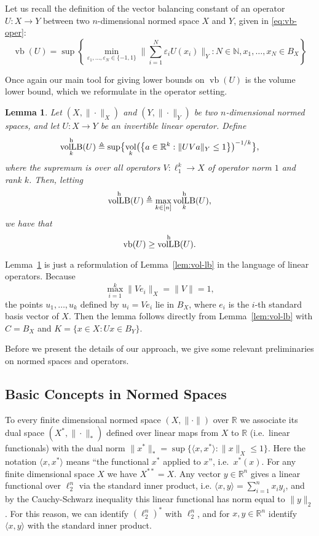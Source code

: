 \documentclass[11pt]{article}
\newtheorem{lemma}[theorem]{Lemma}
\newcommand{\R}{{\mathbb{R}}}
\newcommand\eps{\varepsilon}
\newcommand{\eqdef}{\triangleq}
\newcommand{\set}[1]{\left\{ #1 \right\}}
\DeclareMathOperator{\vollb}{volLB}
\DeclareMathOperator{\vb}{vb}
\DeclareMathOperator{\vol}{vol}
\begin{document}
Let us recall the definition of the vector balancing constant of an
operator $U:X \to Y$ between two $n$-dimensional normed space $X$ and
$Y$, given in \eqref{eq:vb-oper}:
\[
\vb(U) = \sup\left\{
  \min_{\eps_1, \ldots, \eps_N \in \{-1, 1\}} 
  \biggl\|\sum_{i = 1}^N \eps_i U(x_i)\biggr\|_Y:
  N \in \mathbb{N}, x_1, \ldots, x_N \in B_X\right\}
\]

Once again our main tool for giving lower bounds on
$\vb(U)$ is the volume lower bound, which we reformulate in the
operator setting.

\begin{lemma}
\label{lem:vol-lb-oper}
Let $(X, \|\cdot\|_X)$ and $(Y, \|\cdot\|_Y)$ be two $n$-dimensional
normed spaces, and let $U:X \to Y$ be an invertible linear
operator. Define
\[
\vollb_k^{\rm h}(U) \eqdef
\sup\bigl\{\vol_k\bigl(\set{a \in \R^k: \|UV a\|_Y \le 1}\bigr)^{-1/k}\bigr\},
\]
where the supremum is over all operators $V:\ell_1^k \to X$ of
operator norm $1$ and rank $k$. Then, letting
\[
\vollb^{\rm h}(U) \eqdef \max_{k \in [n]} \vollb_k^{\rm h}(U),
\]
we have that
\[
\vb(U) \geq \vollb^{\rm h}(U).
\]
\end{lemma}

Lemma~\ref{lem:vol-lb-oper} is just a reformulation of
Lemma~\ref{lem:vol-lb} in the language of linear operators. Because
\[
\max_{i = 1}^k{\|Ve_i\|_X} = \|V\| = 1,
\]
the points $u_1, \ldots, u_k$ defined by $u_i = V e_i$ lie in $B_X$,
where $e_i$ is the $i$-th standard basis vector of $X$. Then the
lemma follows directly from Lemma~\ref{lem:vol-lb} with $C = B_X$
and $K = \{x \in X: Ux \in B_Y\}$. 

Before we present the details of our approach, we give some
relevant preliminaries on normed spaces and operators. 


\subsection{Basic Concepts in Normed Spaces}
\label{sect:fact-prelims}

To every finite dimensional normed space $(X, \|\cdot\|)$ over $\R$ we
associate its dual space $(X^*, \|\cdot\|_*)$ defined over linear maps
from $X$ to $\R$ (i.e.~linear functionals) with the dual norm
$\|x^*\|_* = \sup\{\langle x, x^*\rangle: \|x\|_X \le 1\}$. Here the
notation $\langle x, x^*\rangle$ means ``the functional $x^*$ applied
to $x$'', i.e.~$x^*(x)$. For any finite dimensional space $X$ we have
$X^{**} = X$. Any vector $y \in \R^n$ gives a linear functional over
$\ell_2^n$ via the standard inner product, i.e. $\langle x, y \rangle
= \sum_{i = 1}^n{x_i y_i}$, and by the Cauchy-Schwarz inequality this
linear functional has norm equal to $\|y\|_2$. For this reason, we can
identify $(\ell_2^n)^*$ with $\ell_2^n$, and for $x, y \in \R^n$
identify $\langle x , y \rangle$ with the standard inner product.
\end{document}

